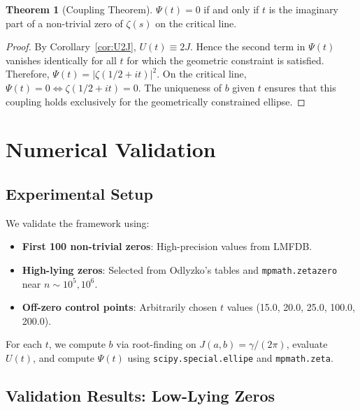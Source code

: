 \documentclass[11pt,a4paper]{article}
\theoremstyle{definition}
\newtheorem{theorem}{Theorem}[section]
\begin{document}
\begin{theorem}[Coupling Theorem]\label{thm:coupling}
\(\Psi(t) = 0\) if and only if \(t\) is the imaginary part of a non-trivial zero of \(\zeta(s)\) on the critical line.
\end{theorem}

\begin{proof}
By Corollary~\ref{cor:U2J}, \(U(t) \equiv 2J\). Hence the second term in \(\Psi(t)\) vanishes identically for all \(t\) for which the geometric constraint is satisfied. 
Therefore, \(\Psi(t) = |\zeta(1/2+it)|^2\). 
On the critical line, \(\Psi(t) = 0 \iff \zeta(1/2+it) = 0\). 
The uniqueness of \(b\) given \(t\) ensures that this coupling holds exclusively for the geometrically constrained ellipse.
\end{proof}

\section{Numerical Validation}\label{sec:validation}

\subsection{Experimental Setup}
We validate the framework using:
\begin{itemize}[leftmargin=2em]
    \item \textbf{First 100 non-trivial zeros}: High-precision values from LMFDB.
    \item \textbf{High-lying zeros}: Selected from Odlyzko's tables and \texttt{mpmath.zetazero} near \(n \sim 10^5, 10^6\).
    \item \textbf{Off-zero control points}: Arbitrarily chosen \(t\) values (15.0, 20.0, 25.0, 100.0, 200.0).
\end{itemize}
For each \(t\), we compute \(b\) via root-finding on \(J(a,b) = \gamma/(2\pi)\), evaluate \(U(t)\), and compute \(\Psi(t)\) using \texttt{scipy.special.ellipe} and \texttt{mpmath.zeta}.

\subsection{Validation Results: Low-Lying Zeros}
\end{document}
